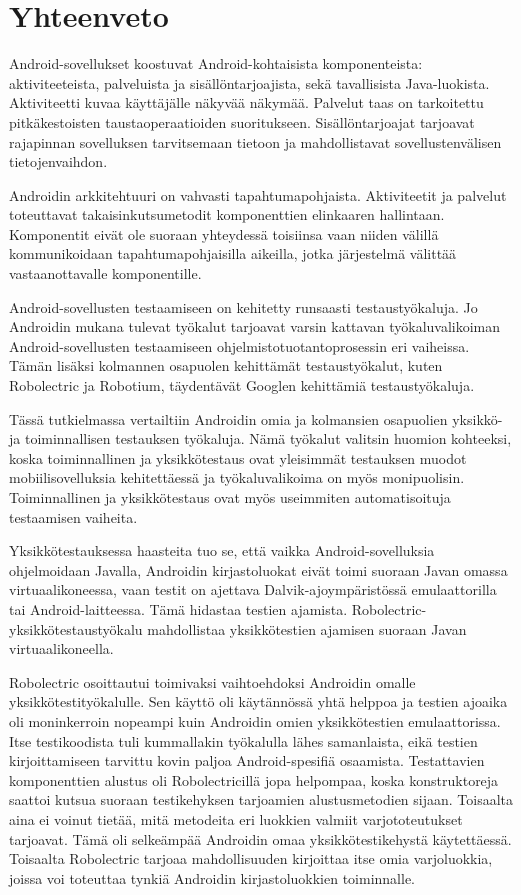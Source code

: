 \section{Yhteenveto}

Android-sovellukset koostuvat Android-kohtaisista komponenteista: aktiviteeteista, palveluista ja sisällöntarjoajista, sekä tavallisista Java-luokista. Aktiviteetti kuvaa käyttäjälle näkyvää näkymää. Palvelut taas on tarkoitettu pitkäkestoisten taustaoperaatioiden suoritukseen. Sisällöntarjoajat tarjoavat rajapinnan sovelluksen tarvitsemaan tietoon ja mahdollistavat sovellustenvälisen tietojenvaihdon.

Androidin arkkitehtuuri on vahvasti tapahtumapohjaista. Aktiviteetit ja palvelut toteuttavat takaisinkutsumetodit komponenttien elinkaaren hallintaan. Komponentit eivät ole suoraan yhteydessä toisiinsa vaan niiden välillä kommunikoidaan tapahtumapohjaisilla aikeilla, jotka järjestelmä välittää vastaanottavalle komponentille.

Android-sovellusten testaamiseen on kehitetty runsaasti testaustyökaluja. Jo Androidin mukana tulevat työkalut tarjoavat varsin kattavan työkaluvalikoiman Android-sovellusten testaamiseen ohjelmistotuotantoprosessin eri vaiheissa. Tämän lisäksi kolmannen osapuolen kehittämät testaustyökalut, kuten Robolectric ja Robotium, täydentävät Googlen kehittämiä testaustyökaluja.

Tässä tutkielmassa vertailtiin Androidin omia ja kolmansien osapuolien yksikkö- ja toiminnallisen testauksen työkaluja. Nämä työkalut valitsin huomion kohteeksi, koska toiminnallinen ja yksikkötestaus ovat yleisimmät testauksen muodot mobiilisovelluksia kehitettäessä ja työkaluvalikoima on myös monipuolisin. Toiminnallinen ja yksikkötestaus ovat myös useimmiten automatisoituja testaamisen vaiheita.

Yksikkötestauksessa haasteita tuo se, että vaikka Android-sovelluksia ohjelmoidaan Javalla, Androidin kirjastoluokat eivät toimi suoraan Javan omassa virtuaalikoneessa, vaan testit on ajettava Dalvik-ajoympäristössä emulaattorilla tai Android-laitteessa. Tämä hidastaa testien ajamista. Robolectric-yksikkötestaustyökalu mahdollistaa yksikkötestien ajamisen suoraan Javan virtuaalikoneella. 

Robolectric osoittautui toimivaksi vaihtoehdoksi Androidin omalle yksikkötestityökalulle. Sen käyttö oli käytännössä yhtä helppoa ja testien ajoaika oli moninkerroin nopeampi kuin Androidin omien yksikkötestien emulaattorissa. Itse testikoodista tuli kummallakin työkalulla lähes samanlaista, eikä testien kirjoittamiseen tarvittu kovin paljoa Android-spesifiä osaamista. Testattavien komponenttien alustus oli Robolectricillä jopa helpompaa, koska konstruktoreja saattoi kutsua suoraan testikehyksen tarjoamien alustusmetodien sijaan. Toisaalta aina ei voinut tietää, mitä metodeita eri luokkien valmiit varjototeutukset tarjoavat. Tämä oli selkeämpää Androidin omaa yksikkötestikehystä käytettäessä. Toisaalta Robolectric tarjoaa mahdollisuuden kirjoittaa itse omia varjoluokkia, joissa voi toteuttaa tynkiä Androidin kirjastoluokkien toiminnalle. 

